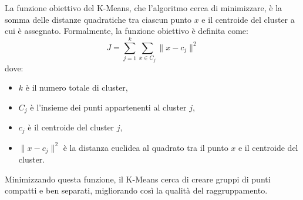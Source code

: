 \documentclass{article}
\begin{document}
La funzione obiettivo del K-Means, che l'algoritmo cerca di minimizzare, è la somma delle distanze quadratiche tra ciascun punto $x$ e il centroide del cluster a cui è assegnato. Formalmente, la funzione obiettivo è definita come:
\begin{equation}
    J = \sum_{j=1}^{k} \sum_{x \in C_j} \| x - c_j \|^2
\end{equation}
dove:
\begin{itemize}
    \item $k$ è il numero totale di cluster,
    \item $C_j$ è l'insieme dei punti appartenenti al cluster $j$,
    \item $c_j$ è il centroide del cluster $j$,
    \item $\| x - c_j \|^2$ è la distanza euclidea al quadrato tra il punto $x$ e il centroide del cluster.
\end{itemize}
Minimizzando questa funzione, il K-Means cerca di creare gruppi di punti compatti e ben separati, migliorando così la qualità del raggruppamento.
\end{document}
